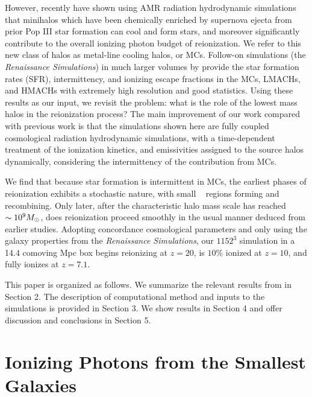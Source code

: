 \documentclass[iop,apj]{emulateapj}
\begin{document}
However, recently \cite{Wise14} have shown using AMR radiation hydrodynamic simulations that minihalos which have been chemically enriched by supernova ejecta from prior Pop III star formation can cool and form stars, and moreover significantly contribute to the overall ionizing photon budget of reionization. We refer to this new class of halos as metal-line cooling halos, or MCs. Follow-on simulations (the {\it Renaissance Simulations}) in much larger volumes by \cite{Xu16} provide the star formation rates (SFR), intermittency, and ionizing escape fractions in the MCs, LMACHs, and HMACHs with extremely high resolution and good statistics. Using these results as our input, we revisit the problem: what is the role of the lowest mass halos in the reionization process? The main improvement of our work compared with previous work is that the simulations shown here are fully coupled cosmological radiation hydrodynamic simulations, with a time-dependent treatment of the ionization kinetics, and emissivities assigned to the source halos dynamically, considering the intermittency of the contribution from MCs. 

We find that because star formation is intermittent in MCs, the earliest phases of reionization exhibits a stochastic nature, with small \hii~ regions forming and recombining. Only later, after the characteristic halo mass scale has reached $\sim 10^9\Ms$, does reionization proceed smoothly in the usual manner deduced from earlier studies. 
Adopting concordance cosmological parameters and only using the galaxy properties from the {\it  Renaissance Simulations}, our $1152^3$ simulation in a 14.4 comoving Mpc box begins reionizing at $z=20$, is $10\%$ ionized at $z=10$, and fully ionizes at $ z=7.1$.  

This paper is organized as follows. We summarize the relevant results from \cite{Xu16} in Section 2. The description of computational method and inputs to the simulations is provided in Section 3. We show results in Section 4 and offer discussion and conclusions in Section 5.

\section{Ionizing Photons from the Smallest Galaxies}
\end{document}
